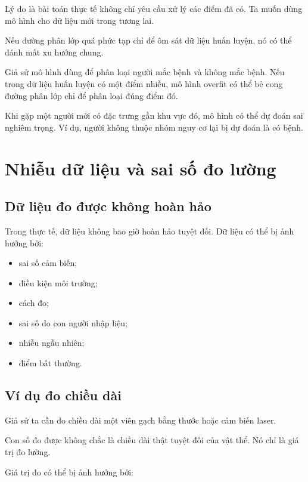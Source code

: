 \documentclass[12pt,a4paper]{report}
\begin{document}
Lý do là bài toán thực tế không chỉ yêu cầu xử lý các điểm đã có. Ta muốn dùng mô hình cho dữ liệu mới trong tương lai.

Nếu đường phân lớp quá phức tạp chỉ để ôm sát dữ liệu huấn luyện, nó có thể đánh mất xu hướng chung.

\begin{vidu}
Giả sử mô hình dùng để phân loại người mắc bệnh và không mắc bệnh. Nếu trong dữ liệu huấn luyện có một điểm nhiễu, mô hình overfit có thể bẻ cong đường phân lớp chỉ để phân loại đúng điểm đó.

Khi gặp một người mới có đặc trưng gần khu vực đó, mô hình có thể dự đoán sai nghiêm trọng. Ví dụ, người không thuộc nhóm nguy cơ lại bị dự đoán là có bệnh.
\end{vidu}

\chapter{Nhiễu dữ liệu và sai số đo lường}

\section{Dữ liệu đo được không hoàn hảo}

Trong thực tế, dữ liệu không bao giờ hoàn hảo tuyệt đối. Dữ liệu có thể bị ảnh hưởng bởi:

\begin{itemize}
    \item sai số cảm biến;
    \item điều kiện môi trường;
    \item cách đo;
    \item sai số do con người nhập liệu;
    \item nhiễu ngẫu nhiên;
    \item điểm bất thường.
\end{itemize}

\section{Ví dụ đo chiều dài}

Giả sử ta cần đo chiều dài một viên gạch bằng thước hoặc cảm biến laser.

Con số đo được không chắc là chiều dài thật tuyệt đối của vật thể. Nó chỉ là giá trị đo lường.

Giá trị đo có thể bị ảnh hưởng bởi:
\end{document}
